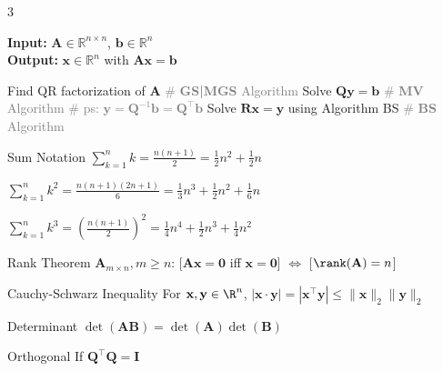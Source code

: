 \documentclass{note}
\newcommand{\codealg}[1]{\textcolor{gray}{\quad \# \textbf{#1} Algorithm}}
\begin{document}
\begin{multicols}{3}

\begin{algorithm}[H]
\tiny
\caption*{\textbf{SQR} (SLE) via QR-Factorization \quad \ps{$C(n)=2n^3+4n^2+n$}}
\textbf{Input:} $\mathbf{A} \in \mathbb{R}^{n \times n}$, $\mathbf{b} \in \mathbb{R}^n$ \\
\textbf{Output:} $\mathbf{x} \in \mathbb{R}^n$ with $\mathbf{A}\mathbf{x} = \mathbf{b}$
\begin{algorithmic}[1]
  \State Find QR factorization of $\mathbf{A}$ \codealg{GS|MGS}
  \State Solve $\mathbf{Q}\mathbf{y} = \mathbf{b}$ \codealg{MV} \quad \textcolor{gray}{\# ps: $\mathbf{y} = \mathbf{Q}^{-1}\mathbf{b}= \mathbf{Q}^\top\mathbf{b}$}
  \State Solve $\mathbf{R}\mathbf{x} = \mathbf{y}$ using Algorithm BS \codealg{BS}
\end{algorithmic}
\end{algorithm}

\vspace{-15pt}
{\tiny
\begin{MyTh}{Sum Notation}
    $\sum_{k=1}^n k = \frac{n(n+1)}{2}=\frac{1}{2}n^2+\frac{1}{2}n$
    
    $\sum_{k=1}^n k^2 = \frac{n(n+1)(2n+1)}{6}=\frac{1}{3}n^3+\frac{1}{2}n^2+\frac{1}{6}n$
    
    $\sum_{k=1}^n k^3 = \left(\frac{n(n+1)}{2}\right)^2=\frac{1}{4}n^4+\frac{1}{2}n^3+\frac{1}{4}n^2$
\end{MyTh}

\begin{MyTh}{Rank Theorem}
    $\mathbf{A}_{m\times n}, m\geq n$: [$\mathbf{Ax}=\mathbf{0}$ iff $\mathbf{x}=\mathbf{0}$] $\Leftrightarrow$ [$\rank(\mathbf{A})=n$]
\end{MyTh}

\vspace{-2pt}
\begin{MyTh}{Cauchy-Schwarz Inequality}
    For $\mathbf{x},\mathbf{y}\in\R^n$, $|\mathbf{x}\cdot\mathbf{y}|=|\mathbf{x}^\top\mathbf{y}|\leq\|\mathbf{x}\|_2\|\mathbf{y}\|_2$
\end{MyTh}

\vspace{-2pt}
\begin{MyTh}{Determinant}
    $\det(\mathbf{A}\mathbf{B})=\det(\mathbf{A})\det(\mathbf{B})$ \quad
\end{MyTh}
\begin{MyTh}{Orthogonal}
    If $\mathbf{Q}^\top\mathbf{Q}=\mathbf{I}$ \quad
\end{MyTh}

}
\end{multicols}
\end{document}
